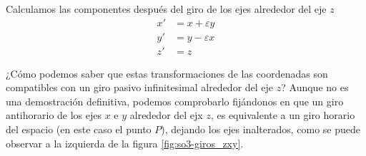 Calculamos las componentes después del giro de los ejes alrededor del
eje $z$
\begin{subequations}\label{eq:so3-giro_z_incxyz}
\begin{align}
  \label{eq:so3-giro_z_incx}
  x' &= x + \varepsilon y\\
  \label{eq:so3-giro_z_incy}
  y' &= y - \varepsilon x\\
  \label{eq:so3-giro_z_incz}
  z' &= z
\end{align}
\end{subequations}

¿Cómo podemos saber que estas transformaciones de las coordenadas son
compatibles con un giro pasivo infinitesimal alrededor del eje $z$?
Aunque no es una demostración definitiva, podemos comprobarlo
fijándonos en que un giro antihorario de los ejes $x$ e $y$ alrededor
del ejx $z$, es equivalente a un giro horario del espacio (en este
caso el punto $P$), dejando los ejes inalterados, como se puede
observar a la izquierda de la figura \ref{fig:so3-giros_zxy}.

